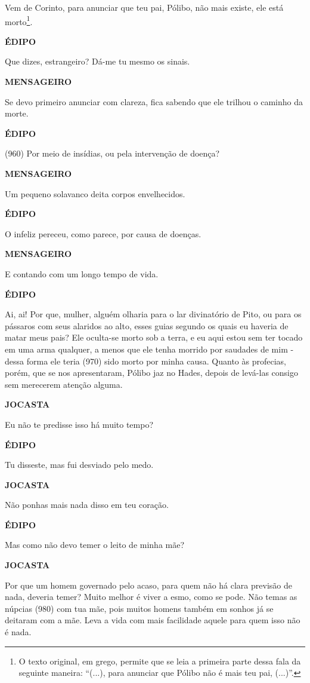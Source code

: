 Vem de Corinto, para anunciar que teu pai, Pólibo, não mais existe, ele
está morto\footnote{O texto original, em grego, permite que se leia a
  primeira parte dessa fala da seguinte maneira: ``(...), para anunciar
  que Pólibo não é mais teu pai, (...)''.}.

\textbf{ÉDIPO}

Que dizes, estrangeiro? Dá-me tu mesmo os sinais.

\textbf{MENSAGEIRO}

Se devo primeiro anunciar com clareza, fica sabendo que ele trilhou o
caminho da morte.

\textbf{ÉDIPO}

(960) Por meio de insídias, ou pela intervenção de doença?

\textbf{MENSAGEIRO}

Um pequeno solavanco deita corpos envelhecidos.

\textbf{ÉDIPO}

O infeliz pereceu, como parece, por causa de doenças.

\textbf{MENSAGEIRO}

E contando com um longo tempo de vida.

\textbf{ÉDIPO}

Ai, ai! Por que, mulher, alguém olharia para o lar divinatório de Pito,
ou para os pássaros com seus alaridos ao alto, esses guias segundo os
quais eu haveria de matar meus pais? Ele oculta-se morto sob a terra, e
eu aqui estou sem ter tocado em uma arma qualquer, a menos que ele tenha
morrido por saudades de mim - dessa forma ele teria (970) sido morto por
minha causa. Quanto às profecias, porém, que se nos apresentaram, Pólibo
jaz no Hades, depois de levá-las consigo sem merecerem atenção alguma.

\textbf{JOCASTA}

Eu não te predisse isso há muito tempo?

\textbf{ÉDIPO}

Tu disseste, mas fui desviado pelo medo.

\textbf{JOCASTA}

Não ponhas mais nada disso em teu coração.

\textbf{ÉDIPO}

Mas como não devo temer o leito de minha mãe?

\textbf{JOCASTA}

Por que um homem governado pelo acaso, para quem não há clara previsão
de nada, deveria temer? Muito melhor é viver a esmo, como se pode. Não
temas as núpcias (980) com tua mãe, pois muitos homens também em sonhos
já se deitaram com a mãe. Leva a vida com mais facilidade aquele para
quem isso não é nada.

